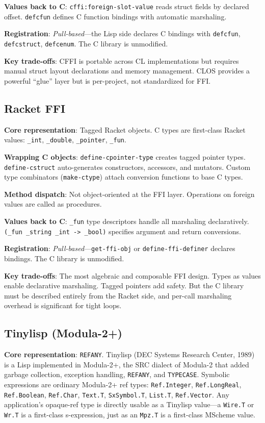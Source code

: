 \documentclass[11pt]{article}
\begin{document}
\textbf{Values back to C}:
\texttt{cffi:foreign-slot-value} reads struct fields by declared
offset.  \texttt{defcfun} defines C function bindings with automatic
marshaling.

\textbf{Registration}: \emph{Pull-based}---the Lisp side declares C
bindings with \texttt{defcfun}, \texttt{defcstruct},
\texttt{defcenum}.  The C library is unmodified.

\textbf{Key trade-offs}: CFFI is portable across CL implementations
but requires manual struct layout declarations and memory management.
CLOS provides a powerful ``glue'' layer but is per-project, not
standardized for FFI.


\subsection{Racket FFI}
\label{sec:racket-ffi}

\textbf{Core representation}: Tagged Racket objects.  C types are
first-class Racket values: \texttt{\_int}, \texttt{\_double},
\texttt{\_pointer}, \texttt{\_fun}.

\textbf{Wrapping C objects}:
\texttt{define-cpointer-type} creates tagged pointer types.
\texttt{define-cstruct} auto-generates constructors, accessors, and
mutators.  Custom type combinators (\texttt{make-ctype}) attach
conversion functions to base C types.

\textbf{Method dispatch}: Not object-oriented at the FFI layer.
Operations on foreign values are called as procedures.

\textbf{Values back to C}: \texttt{\_fun} type descriptors handle all
marshaling declaratively.
\texttt{(\_fun \_string \_int -> \_bool)} specifies argument and
return conversions.

\textbf{Registration}: \emph{Pull-based}---\texttt{get-ffi-obj} or
\texttt{define-ffi-definer} declares bindings.  The C library is
unmodified.

\textbf{Key trade-offs}: The most algebraic and composable FFI design.
Types as values enable declarative marshaling.  Tagged pointers add
safety.  But the C library must be described entirely from the Racket
side, and per-call marshaling overhead is significant for tight loops.


\subsection{Tinylisp (Modula-2+)}
\label{sec:tinylisp}

\textbf{Core representation}: \texttt{REFANY}.  Tinylisp (DEC Systems
Research Center, 1989)~\cite{ellis1989} is a Lisp implemented in
Modula-2+, the SRC dialect of Modula-2 that added garbage collection,
exception handling, \texttt{REFANY}, and \texttt{TYPECASE}.  Symbolic
expressions are ordinary Modula-2+ ref types: \texttt{Ref.Integer},
\texttt{Ref.LongReal}, \texttt{Ref.Boolean}, \texttt{Ref.Char},
\texttt{Text.T}, \texttt{SxSymbol.T}, \texttt{List.T},
\texttt{Ref.Vector}.  Any application's opaque-ref type is directly
usable as a Tinylisp value---a \texttt{Wire.T} or \texttt{Wr.T} is a
first-class s-expression, just as an \texttt{Mpz.T} is a first-class
MScheme value.
\end{document}
